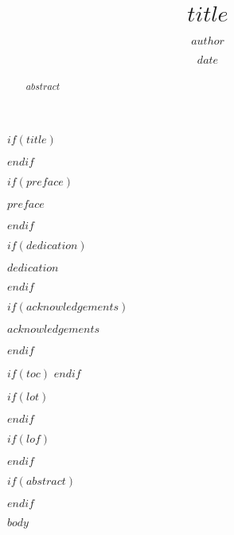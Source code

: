 \documentclass[12pt,twoside,openany]{reedthesis}
\title{$title$}
\author{$author$}
\date{$date$}
\begin{document}
$if(title)$
  \maketitle
$endif$

\frontmatter %
\pagestyle{empty} %

$if(preface)$
  \begin{preface}
    $preface$
  \end{preface}
$endif$

$if(dedication)$
 \begin{dedication}
   $dedication$
 \end{dedication}
$endif$

$if(acknowledgements)$
 \begin{acknowledgements}
   $acknowledgements$
 \end{acknowledgements}
$endif$

$if(toc)$
  \hypersetup{linkcolor=$if(toccolor)$$toccolor$$else$black$endif$}
  \setcounter{tocdepth}{$toc-depth$}
  \tableofcontents
$endif$

$if(lot)$
  \listoftables
$endif$

$if(lof)$
  \listoffigures
$endif$

$if(abstract)$
  \begin{abstract}
    $abstract$
  \end{abstract}
$endif$

\mainmatter %
\pagestyle{fancyplain} %
\doublespacing{} %

$body$
\end{document}
